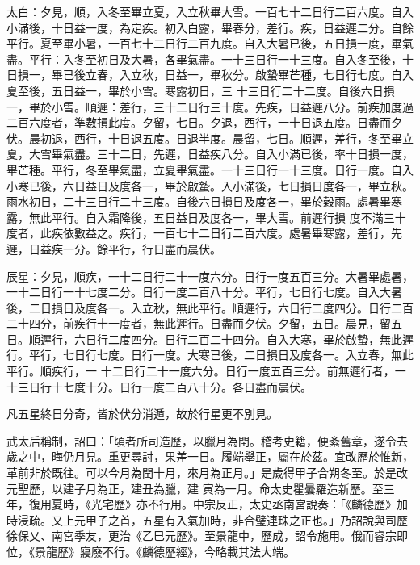 \begin{pinyinscope}
 太白：夕見，順，入冬至畢立夏，入立秋畢大雪。一百七十二日行二百六度。自入小滿後，十日益一度，為定疾。初入白露，畢春分，差行。疾，日益遲二分。自餘平行。夏至畢小暑，一百七十二日行二百九度。自入大暑已後，五日損一度，畢氣盡。平行：入冬至初日及大暑，各畢氣盡。一十三日行一十三度。自入冬至後，十日損一，畢已後立春，入立秋，日益一，畢秋分。啟蟄畢芒種，七日行七度。自入夏至後，五日益一，畢於小雪。寒露初日，三
 十三日行二十二度。自後六日損一，畢於小雪。順遲：差行，三十二日行三十度。先疾，日益遲八分。前疾加度過二百六度者，準數損此度。夕留，七日。夕退，西行，一十日退五度。日盡而夕伏。晨初退，西行，十日退五度。日退半度。晨留，七日。順遲，差行，冬至畢立夏，大雪畢氣盡。三十二日，先遲，日益疾八分。自入小滿已後，率十日損一度，畢芒種。平行，冬至畢氣盡，立夏畢氣盡。一十三日行一十三度。日行一度。自入小寒已後，六日益日及度各一，畢於啟蟄。入小滿後，七日損日度各一，畢立秋。雨水初日，二十三日行二十三度。自後六日損日及度各一，畢於穀雨。處暑畢寒露，無此平行。自入霜降後，五日益日及度各一，畢大雪。前遲行損
 度不滿三十度者，此疾依數益之。疾行，一百七十二日行二百六度。處暑畢寒露，差行，先遲，日益疾一分。餘平行，行日盡而晨伏。



 辰星：夕見，順疾，一十二日行二十一度六分。日行一度五百三分。大暑畢處暑，一十二日行一十七度二分。日行一度二百八十分。平行，七日行七度。自入大暑後，二日損日及度各一。入立秋，無此平行。順遲行，六日行二度四分。日行二百二十四分，前疾行十一度者，無此遲行。日盡而夕伏。夕留，五日。晨見，留五日。順遲行，六日行二度四分。日行二百二十四分。自入大寒，畢於啟蟄，無此遲行。平行，七日行七度。日行一度。大寒已後，二日損日及度各一。入立春，無此平行。順疾行，一
 十二日行二十一度六分。日行一度五百三分。前無遲行者，一十三日行十七度十分。日行一度二百八十分。各日盡而晨伏。



 凡五星終日分奇，皆於伏分消遁，故於行星更不別見。



 武太后稱制，詔曰：「頃者所司造歷，以臘月為閏。稽考史籍，便紊舊章，遂令去歲之中，晦仍月見。重更尋討，果差一日。履端舉正，屬在於茲。宜改歷於惟新，革前非於既往。可以今月為閏十月，來月為正月。」是歲得甲子合朔冬至。於是改元聖歷，以建子月為正，建丑為臘，建
 寅為一月。命太史瞿曇羅造新歷。至三年，復用夏時，《光宅歷》亦不行用。中宗反正，太史丞南宮說奏：「《麟德歷》加時浸疏。又上元甲子之首，五星有入氣加時，非合璧連珠之正也。」乃詔說與司歷徐保乂、南宮季友，更治《乙巳元歷》。至景龍中，歷成，詔令施用。俄而睿宗即位，《景龍歷》寢廢不行。《麟德歷經》，今略載其法大端。




\end{pinyinscope}
